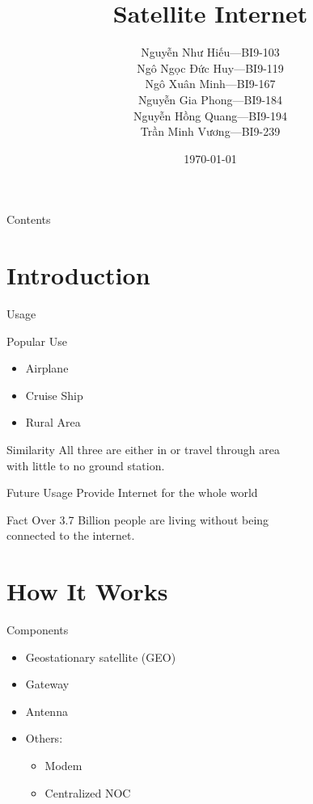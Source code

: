 \documentclass[pdf]{beamer}
\title{Satellite Internet}
\author[Group 1]{Nguyễn Như Hiếu---BI9-103\\
                 Ngô Ngọc Đức Huy---BI9-119\\
                 Ngô Xuân Minh---BI9-167\\
                 Nguyễn Gia Phong---BI9-184\\
                 Nguyễn Hồng Quang---BI9-194\\
                 Trần Minh Vương---BI9-239}
\institute{University of Science and Technology of Hà Nội}
\date{\selectlanguage{english}\today}
\begin{document}
\frame{\titlepage}
\begin{frame}{Contents}
  \tableofcontents
\end{frame}

\section{Introduction}
\frame{\tableofcontents[currentsection]}
\begin{frame}{Usage}\Large
  \begin{block}{Popular Use}
    \begin{itemize}
      \item Airplane
      \item Cruise Ship
      \item Rural Area
    \end{itemize}
  \end{block}
  \begin{block}{Similarity}
    All three are either in or travel through area \\
    with little to no ground station.
  \end{block}
\end{frame}

\begin{frame}{Future Usage}\Large
  Provide Internet for the whole world

  \begin{block}{Fact}
    Over 3.7 Billion people are living without being \\
    connected to the internet.
  \end{block}
\end{frame}

\section{How It Works}
\frame{\tableofcontents[currentsection]}
\begin{frame}{Components}
  \begin{itemize}\Large
    \item Geostationary satellite (GEO)
    \item Gateway
    \item Antenna
    \item Others:
      \begin{itemize}\Large
        \item Modem
        \item Centralized NOC
      \end{itemize}
  \end{itemize}
\end{frame}
\end{document}
